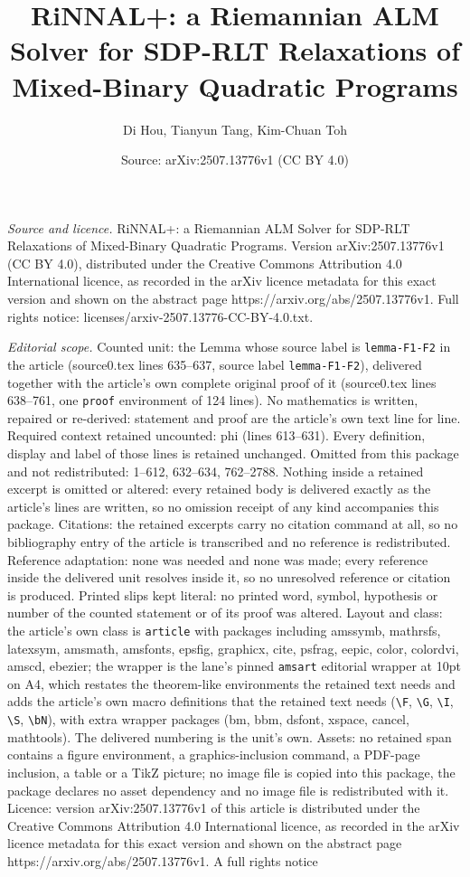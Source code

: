 \documentclass[10pt,a4paper]{amsart}
\title[RiNNAL+: a Riemannian ALM Solver for SDP-RLT Relaxations of ]{RiNNAL+: a Riemannian ALM Solver for SDP-RLT Relaxations of Mixed-Binary Quadratic Programs}
\author{Di Hou, Tianyun Tang, Kim-Chuan Toh}
\date{Source: arXiv:2507.13776v1 (CC BY 4.0)}
\begin{document}
\maketitle

\noindent\emph{Source and licence.} RiNNAL+: a Riemannian ALM Solver for SDP-RLT Relaxations of Mixed-Binary Quadratic Programs. Version arXiv:2507.13776v1 (CC BY 4.0), distributed under the Creative Commons Attribution 4.0 International licence, as recorded in the arXiv licence metadata for this exact version and shown on the abstract page https://arxiv.org/abs/2507.13776v1. Full rights notice: licenses/arxiv-2507.13776-CC-BY-4.0.txt.\par\smallskip

\noindent\textit{Editorial scope.} Counted unit: the Lemma whose source label is \texttt{lemma-F1-F2} in the article (source0.tex lines 635--637, source label \texttt{lemma-F1-F2}), delivered together with the article's own complete original proof of it (source0.tex lines 638--761, one \texttt{proof} environment of 124 lines). No mathematics is written, repaired or re-derived: statement and proof are the article's own text line for line. Required context retained uncounted: phi (lines 613--631). Every definition, display and label of those lines is retained unchanged. Omitted from this package and not redistributed: 1--612, 632--634, 762--2788. Nothing inside a retained excerpt is omitted or altered: every retained body is delivered exactly as the article's lines are written, so no omission receipt of any kind accompanies this package. Citations: the retained excerpts carry no citation command at all, so no bibliography entry of the article is transcribed and no reference is redistributed. Reference adaptation: none was needed and none was made; every reference inside the delivered unit resolves inside it, so no unresolved reference or citation is produced. Printed slips kept literal: no printed word, symbol, hypothesis or number of the counted statement or of its proof was altered. Layout and class: the article's own class is \texttt{article} with packages including amssymb, mathrsfs, latexsym, amsmath, amsfonts, epsfig, graphicx, cite, psfrag, eepic, color, colordvi, amscd, ebezier; the wrapper is the lane's pinned \texttt{amsart} editorial wrapper at 10pt on A4, which restates the theorem-like environments the retained text needs and adds the article's own macro definitions that the retained text needs (\texttt{\textbackslash F}, \texttt{\textbackslash G}, \texttt{\textbackslash I}, \texttt{\textbackslash S}, \texttt{\textbackslash bN}), with extra wrapper packages (bm, bbm, dsfont, xspace, cancel, mathtools). The delivered numbering is the unit's own. Assets: no retained span contains a figure environment, a graphics-inclusion command, a PDF-page inclusion, a table or a TikZ picture; no image file is copied into this package, the package declares no asset dependency and no image file is redistributed with it. Licence: version arXiv:2507.13776v1 of this article is distributed under the Creative Commons Attribution 4.0 International licence, as recorded in the arXiv licence metadata for this exact version and shown on the abstract page https://arxiv.org/abs/2507.13776v1. A full rights notice 
\end{document}
